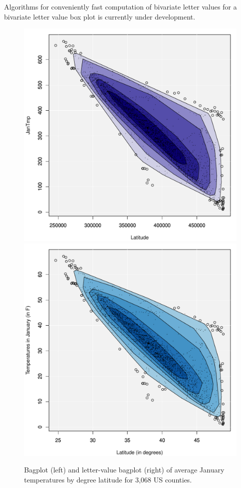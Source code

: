 \documentclass[oneside]{article}
\begin{document}
Algorithms for conveniently fast computation of bivariate letter values for a bivariate letter value box plot is currently under development.

\begin{figure}[hbtp]
  \centering
   \includegraphics[scale=0.45]{images/counties-bag}
   \includegraphics[scale=0.45]{images/counties-lvbag}
  \caption{Bagplot (left) and letter-value bagplot (right) of average January temperatures by degree latitude for 3,068 US counties. }
  \label{counties-bag} 
\end{figure}
\end{document}
